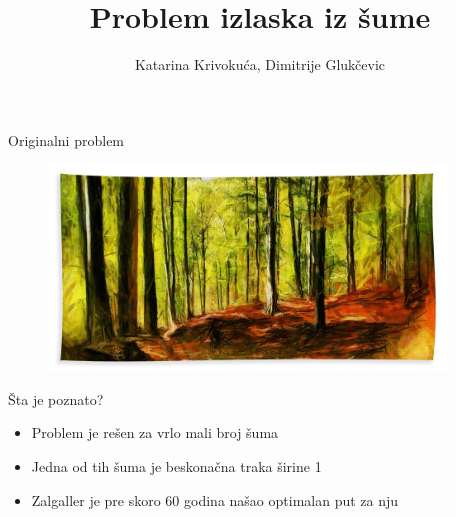 \documentclass[12pt]{beamer}
\title{Problem izlaska iz \v sume}
\author{Katarina Krivoku\' ca, Dimitrije Gluk\v cevic}
\institute{\small IS Petnica}
\theoremstyle{definition}
\theoremstyle{remark}
\theoremstyle{plain}
\begin{document}
\begin{frame}
  \titlepage
\end{frame}


\begin{frame}{Originalni problem}
\begin{figure}
\begin{center}
\includegraphics[width=300pt]{suma.jpg}
\end{center}
\end{figure}
\end{frame}




\begin{frame}{\v Sta je poznato?}
\begin{itemize}
\item Problem je re\v sen za vrlo mali broj \v suma
\pause
\item Jedna od tih \v suma je beskona\v cna traka \v sirine 1
\pause
\item Zalgaller je pre skoro 60 godina na\v sao optimalan put za nju
\end{itemize}



\begin{center}
\end{center}

\end{frame}
\end{document}
